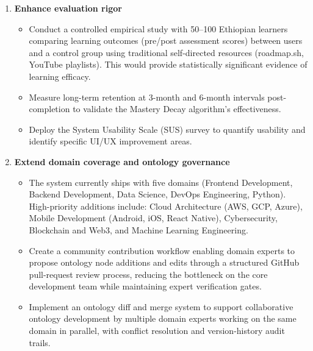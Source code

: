 \begin{enumerate}
    \item \textbf{Enhance evaluation rigor}
        \begin{itemize}
            \item Conduct a controlled empirical study with 50--100 Ethiopian learners comparing learning outcomes (pre/post assessment scores) between \projectname{} users and a control group using traditional self-directed resources (roadmap.sh, YouTube playlists). This would provide statistically significant evidence of learning efficacy.
            \item Measure long-term retention at 3-month and 6-month intervals post-completion to validate the Mastery Decay algorithm's effectiveness.
            \item Deploy the System Usability Scale (SUS) survey to quantify usability and identify specific UI/UX improvement areas.
        \end{itemize}

    \item \textbf{Extend domain coverage and ontology governance}
        \begin{itemize}
            \item The system currently ships with five domains (Frontend Development, Backend Development, Data Science, DevOps Engineering, Python). High-priority additions include: Cloud Architecture (AWS, GCP, Azure), Mobile Development (Android, iOS, React Native), Cybersecurity, Blockchain and Web3, and Machine Learning Engineering.
            \item Create a community contribution workflow enabling domain experts to propose ontology node additions and edits through a structured GitHub pull-request review process, reducing the bottleneck on the core development team while maintaining expert verification gates.
            \item Implement an ontology diff and merge system to support collaborative ontology development by multiple domain experts working on the same domain in parallel, with conflict resolution and version-history audit trails.
        \end{itemize}


\end{enumerate}
